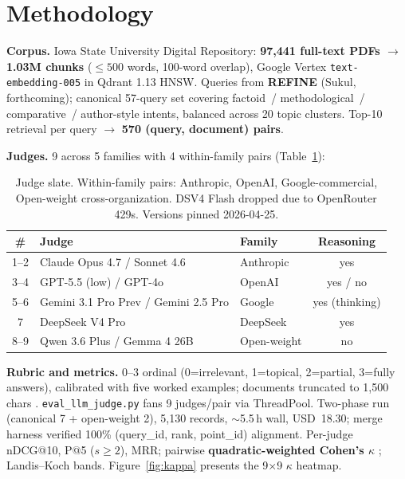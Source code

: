 \documentclass[11pt,letterpaper]{article}
\begin{document}
\section{Methodology}\label{sec:method}

\textbf{Corpus.} Iowa State University Digital Repository: \textbf{97{,}441 full-text PDFs $\rightarrow$ 1.03M chunks} ($\leq 500$ words, 100-word overlap), Google Vertex \texttt{text-embedding-005} in Qdrant 1.13 HNSW. Queries from \textbf{REFINE} (Sukul, forthcoming); canonical 57-query set covering factoid~/ methodological~/ comparative~/ author-style intents, balanced across 20 topic clusters. Top-10 retrieval per query $\rightarrow$ \textbf{570 (query, document) pairs}.

\textbf{Judges.} 9 across 5 families with 4 within-family pairs (Table~\ref{tab:judges}):

\begin{table}[h]
\small
\centering
\begin{tabular}{@{}cllc@{}}
\toprule
\# & Judge & Family & Reasoning \\
\midrule
1--2 & Claude Opus 4.7 / Sonnet 4.6 & Anthropic & yes \\
3--4 & GPT-5.5 (low) / GPT-4o & OpenAI & yes / no \\
5--6 & Gemini 3.1 Pro Prev / Gemini 2.5 Pro & Google & yes (thinking) \\
7 & DeepSeek V4 Pro & DeepSeek & yes \\
8--9 & Qwen 3.6 Plus / Gemma 4 26B & Open-weight & no \\
\bottomrule
\end{tabular}
\caption{Judge slate. Within-family pairs: Anthropic, OpenAI, Google-commercial, Open-weight cross-organization. DSV4 Flash dropped due to OpenRouter 429s. Versions pinned 2026-04-25.}
\label{tab:judges}
\end{table}

\textbf{Rubric and metrics.} 0--3 ordinal (0=irrelevant, 1=topical, 2=partial, 3=fully answers), calibrated with five worked examples; documents truncated to 1{,}500 chars \citep{saito2023verbosity}. \texttt{eval\_llm\_judge.py} fans 9 judges/pair via ThreadPool. Two-phase run (canonical 7 + open-weight 2), 5{,}130 records, $\sim$5.5\,h wall, USD~18.30; merge harness verified 100\% (query\_id, rank, point\_id) alignment. Per-judge nDCG@10, P@5 ($s \geq 2$), MRR; pairwise \textbf{quadratic-weighted Cohen's $\kappa$} \citep{thakur2024judges,cohen1968,fleiss1971}; Landis--Koch \citep{landis1977} bands. Figure~\ref{fig:kappa} presents the 9$\times$9 $\kappa$ heatmap.
\end{document}
